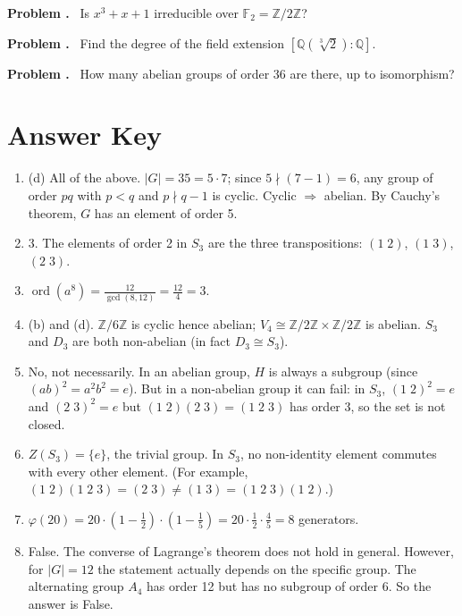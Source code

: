 \documentclass[11pt]{article}
\newcounter{prob}
\newcommand{\problem}{\stepcounter{prob}\medskip\noindent\textbf{Problem \theprob.}\ }
\begin{document}
\problem
Is $x^3 + x + 1$ irreducible over $\mathbb{F}_2 = \mathbb{Z}/2\mathbb{Z}$?

\problem
Find the degree of the field extension $[\mathbb{Q}(\sqrt[3]{2}):\mathbb{Q}]$.

\problem
How many abelian groups of order 36 are there, up to isomorphism?


\newpage
\section*{Answer Key}

\begin{enumerate}

\item (d) All of the above. $|G|=35=5\cdot 7$; since $5\nmid (7-1)=6$, any group of order $pq$ with $p<q$ and $p\nmid q-1$ is cyclic. Cyclic $\Rightarrow$ abelian. By Cauchy's theorem, $G$ has an element of order 5.

\item 3. The elements of order 2 in $S_3$ are the three transpositions: $(1\;2)$, $(1\;3)$, $(2\;3)$.

\item $\operatorname{ord}(a^8)=\frac{12}{\gcd(8,12)}=\frac{12}{4}=3$.

\item (b) and (d). $\mathbb{Z}/6\mathbb{Z}$ is cyclic hence abelian; $V_4\cong\mathbb{Z}/2\mathbb{Z}\times\mathbb{Z}/2\mathbb{Z}$ is abelian. $S_3$ and $D_3$ are both non-abelian (in fact $D_3\cong S_3$).

\item No, not necessarily. In an abelian group, $H$ is always a subgroup (since $(ab)^2=a^2b^2=e$). But in a non-abelian group it can fail: in $S_3$, $(1\;2)^2=e$ and $(2\;3)^2=e$ but $(1\;2)(2\;3)=(1\;2\;3)$ has order 3, so the set is not closed.

\item $Z(S_3)=\{e\}$, the trivial group. In $S_3$, no non-identity element commutes with every other element. (For example, $(1\;2)(1\;2\;3)=(2\;3)\neq(1\;3)=(1\;2\;3)(1\;2)$.)

\item $\varphi(20)=20\cdot(1-\frac{1}{2})\cdot(1-\frac{1}{5})=20\cdot\frac{1}{2}\cdot\frac{4}{5}=8$ generators.

\item False. The converse of Lagrange's theorem does not hold in general. However, for $|G|=12$ the statement actually depends on the specific group. The alternating group $A_4$ has order 12 but has no subgroup of order 6. So the answer is False.


\end{enumerate}
\end{document}
